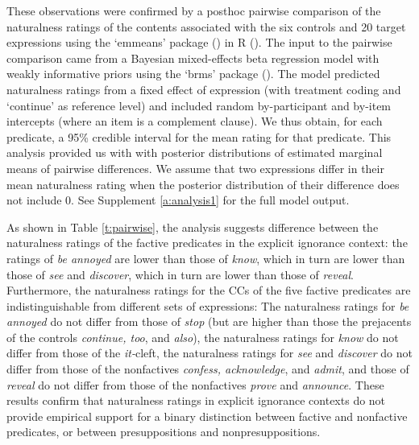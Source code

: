 \documentclass[11pt,fleqn]{article}
\newcommand{\6}{\mbox{$[\hspace*{-.6mm}[$}}
\newcommand{\9}{\mbox{$]\hspace*{-.6mm}]$}}
\begin{document}
These observations were confirmed by a posthoc pairwise comparison of the naturalness ratings of the contents associated with the six controls and 20 target expressions using the `emmeans' package (\citealt{emmeans}) in R (\citealt{r}). The input to the pairwise comparison came from a Bayesian mixed-effects beta regression model with weakly informative priors using the `brms' package (\citealt{buerkner2017}). The model predicted naturalness ratings from a fixed effect of expression (with treatment coding and `continue' as reference level) and included random by-participant and by-item intercepts (where an item is a complement clause). We thus obtain, for each predicate, a 95\% credible interval for the mean rating for that predicate. This analysis provided us with with posterior distributions of estimated marginal means of pairwise differences. We assume that two expressions differ in their mean naturalness rating when the posterior distribution of their difference does not include 0. See Supplement \ref{a:analysis1} for the full model output. 

As shown in Table \ref{t:pairwise}, the analysis suggests difference between the naturalness ratings of the factive predicates in the explicit ignorance context: the ratings of {\em be annoyed} are lower than those of {\em know}, which in turn are lower than those of {\em see} and {\em discover}, which in turn are lower than those of {\em reveal}. Furthermore, the naturalness ratings for the CCs of the five factive predicates are indistinguishable from different sets of expressions: The naturalness ratings for {\em be annoyed} do not differ from those of {\em stop} (but are higher than those the prejacents of the controls {\em continue, too}, and {\em also}), the naturalness ratings for {\em know} do not differ from those of the {\em it-}cleft, the naturalness ratings for {\em see} and {\em discover} do not differ from those of the nonfactives {\em confess, acknowledge}, and {\em admit}, and those of {\em reveal} do not differ from those of the nonfactives {\em prove} and {\em announce}. These results confirm that naturalness ratings in explicit ignorance contexts do not provide empirical support for a binary distinction between factive and nonfactive predicates, or between presuppositions and nonpresuppositions.
\end{document}
